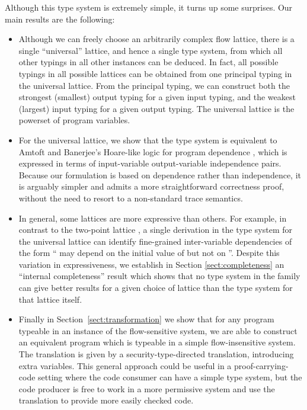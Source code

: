 \documentclass{sigplanconf}
\begin{document}
Although this type system is extremely simple, it turns up some surprises. 
Our main results are the following:
\begin{itemize}
\item Although we can freely choose an arbitrarily
  complex flow lattice, there is a single ``universal'' lattice, and hence
  a single type system, from which all other typings in all other
  instances can be deduced.
In fact, all possible typings in all possible lattices
  can be obtained from one 
  principal typing in the universal lattice.
  From the principal typing, we can construct both
  the strongest (smallest) output typing for a given input typing,
  and the weakest (largest) input typing for a given output typing.
  The universal lattice is the powerset of program variables. 
\item For the universal lattice, we show that the type system is
  equivalent to Amtoft and Banerjee's 
  Hoare-like logic for program dependence
  \cite{Amtoft:Banerjee:SAS04}, which is expressed in terms of
  input-variable output-variable independence pairs. Because our
  formulation is based on dependence rather than independence, it
  is arguably simpler and admits a more straightforward correctness
  proof, without the need to resort to a non-standard trace semantics.
\item In general, some lattices are more expressive than others.
    For example, in contrast to the two-point lattice ,
  a single derivation in the type system for the universal lattice
    can identify fine-grained inter-variable dependencies of the form
  `` may depend on the initial value of  but not on ''.
  Despite this variation in expressiveness, we establish in Section \ref{sect:completeness} 
  an ``internal completeness'' result which shows that no type system in the family
  can give better results for a given choice of lattice than the
  type system for that lattice itself.
\item Finally in Section~\ref{sect:transformation} we show that for any program
  typeable in an instance of the flow-sensitive system, we are able to
  construct an equivalent program which is typeable in a simple
  flow-insensitive system. The translation is given by a
  security-type-directed translation, introducing extra variables.
  This general approach could be useful in a proof-carrying-code
  setting where the code consumer can have a simple type system, but
  the code producer is free to work in a more permissive system and
  use the translation to provide more easily checked code.
\end{itemize}
\end{document}
